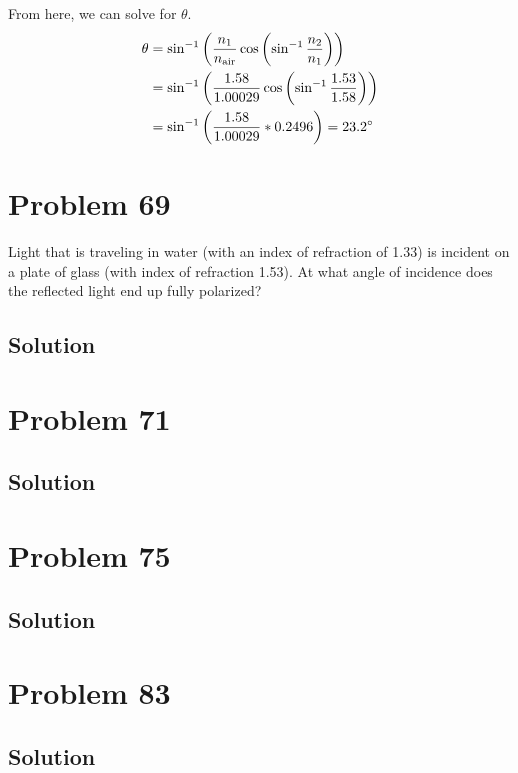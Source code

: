 \documentclass[12pt]{article}
\begin{document}
            From here, we can solve for $\theta$.
            \begin{align}
                \theta  &=  \sin^{-1} \left( \frac{n_1}{n_{\rm air}}  \cos \left( \sin^{-1} \frac{n_2}{n_1} \right) \right)\\
                    &=  \sin^{-1} \left( \frac{1.58}{1.00029}  \cos \left( \sin^{-1} \frac{1.53}{1.58} \right) \right)\\
                    &=  \sin^{-1} \left( \frac{1.58}{1.00029} * 0.2496 \right)
                    =   23.2\unit{\degree}
            \end{align}

    \pagebreak
    \section{Problem 69}
        Light that is traveling in water (with an index of refraction of 1.33) is incident on a plate of glass (with index of refraction 1.53). 
        At what angle of incidence does the reflected light end up fully polarized?

        \subsection{Solution}

    \pagebreak
    \section{Problem 71}

        \subsection{Solution}

    \pagebreak
    \section{Problem 75}

        \subsection{Solution}

    \pagebreak
    \section{Problem 83}

        \subsection{Solution}
\end{document}
